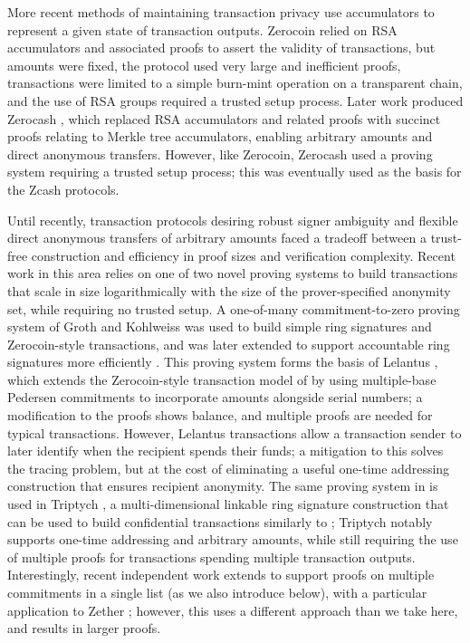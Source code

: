 \documentclass{article}
\theoremstyle{definition}
\begin{document}
More recent methods of maintaining transaction privacy use accumulators to represent a given state of transaction outputs.
Zerocoin \cite{zerocoin} relied on RSA accumulators and associated proofs to assert the validity of transactions, but amounts were fixed, the protocol used very large and inefficient proofs, transactions were limited to a simple burn-mint operation on a transparent chain, and the use of RSA groups required a trusted setup process.
Later work produced Zerocash \cite{zerocash}, which replaced RSA accumulators and related proofs with succinct proofs relating to Merkle tree accumulators, enabling arbitrary amounts and direct anonymous transfers.
However, like Zerocoin, Zerocash used a proving system requiring a trusted setup process; this was eventually used as the basis for the Zcash protocols.

Until recently, transaction protocols desiring robust signer ambiguity and flexible direct anonymous transfers of arbitrary amounts faced a tradeoff between a trust-free construction and efficiency in proof sizes and verification complexity.
Recent work in this area relies on one of two novel proving systems to build transactions that scale in size logarithmically with the size of the prover-specified anonymity set, while requiring no trusted setup.
A one-of-many commitment-to-zero proving system of Groth and Kohlweiss was used to build simple ring signatures and Zerocoin-style transactions, and was later extended to support accountable ring signatures more efficiently \cite{groth,bootle}.
This proving system forms the basis of Lelantus \cite{lelantus}, which extends the Zerocoin-style transaction model of \cite{groth} by using multiple-base Pedersen commitments to incorporate amounts alongside serial numbers; a modification to the proofs shows balance, and multiple proofs are needed for typical transactions.
However, Lelantus transactions allow a transaction sender to later identify when the recipient spends their funds; a mitigation to this solves the tracing problem, but at the cost of eliminating a useful one-time addressing construction that ensures recipient anonymity.
The same proving system in \cite{groth} is used in Triptych \cite{triptych}, a multi-dimensional linkable ring signature construction that can be used to build confidential transactions similarly to \cite{ringct}; Triptych notably supports one-time addressing and arbitrary amounts, while still requiring the use of multiple proofs for transactions spending multiple transaction outputs.
Interestingly, recent independent work extends \cite{groth} to support proofs on multiple commitments in a single list (as we also introduce below), with a particular application to Zether \cite{zether}; however, this uses a different approach than we take here, and results in larger proofs.
\end{document}
